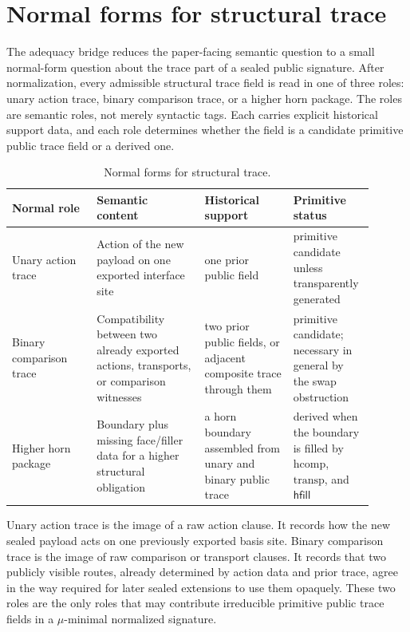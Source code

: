 \documentclass{lmcs}
\newcommand{\hcomp}{\mathrm{hcomp}}
\newcommand{\transp}{\mathrm{transp}}
\begin{document}
\section{Normal forms for structural trace}
\label{sec:trace-normal-forms}

The adequacy bridge reduces the paper-facing semantic question to a small
normal-form question about the trace part of a sealed public signature. After
normalization, every admissible structural trace field is read in one of three
roles: unary action trace, binary comparison trace, or a higher horn package.
The roles are semantic roles, not merely syntactic tags. Each carries explicit
historical support data, and each role determines whether the field is a
candidate primitive public trace field or a derived one.

\begin{table}[t]
\centering
\caption{Normal forms for structural trace.}
\label{tab:trace-normal-forms}
\small
\begin{tabular}{@{}p{0.22\linewidth}p{0.28\linewidth}p{0.23\linewidth}p{0.17\linewidth}@{}}
\toprule
Normal role & Semantic content & Historical support & Primitive status \\
\midrule
Unary action trace & Action of the new payload on one exported interface site & one prior public field & primitive candidate unless transparently generated \\
Binary comparison trace & Compatibility between two already exported actions, transports, or comparison witnesses & two prior public fields, or adjacent composite trace through them & primitive candidate; necessary in general by the swap obstruction \\
Higher horn package & Boundary plus missing face/filler data for a higher structural obligation & a horn boundary assembled from unary and binary public trace & derived when the boundary is filled by $\hcomp$, $\transp$, and $\mathsf{hfill}$ \\
\bottomrule
\end{tabular}
\end{table}

Unary action trace is the image of a raw action clause. It records how the new
sealed payload acts on one previously exported basis site. Binary comparison
trace is the image of raw comparison or transport clauses. It records that two
publicly visible routes, already determined by action data and prior trace,
agree in the way required for later sealed extensions to use them opaquely.
These two roles are the only roles that may contribute irreducible primitive
public trace fields in a $\mu$-minimal normalized signature.
\end{document}
